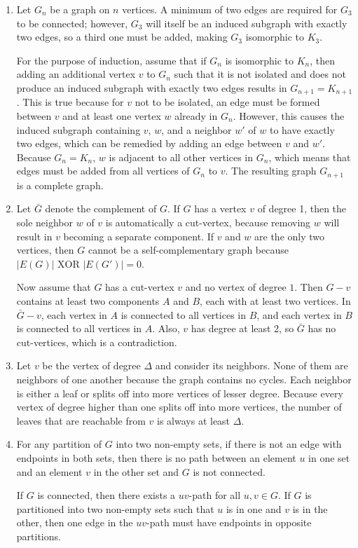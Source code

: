 \documentclass[a4paper,12pt]{article}
\begin{document}
\begin{enumerate}
	\item Let $G_n$ be a graph on $n$ vertices. A minimum of two edges are required for $G_3$ to be connected; however, $G_3$ will itself be an induced subgraph with exactly two edges, so a third one must be added, making $G_3$ isomorphic to $K_3$. \par
	For the purpose of induction, assume that if $G_n$ is isomorphic to $K_n$, then adding an additional vertex $v$ to $G_n$ such that it is not isolated and does not produce an induced subgraph with exactly two edges results in $G_{n + 1} = K_{n + 1}$. This is true because for $v$ not to be isolated, an edge must be formed between $v$ and at least one vertex $w$ already in $G_n$. However, this causes the induced subgraph containing $v$, $w$, and a neighbor $w'$ of $w$ to have exactly two edges, which can be remedied by adding an edge between $v$ and $w'$. Because $G_n = K_n$, $w$ is adjacent to all other vertices in $G_n$, which means that edges must be added from all vertices of $G_n$ to $v$. The resulting graph $G_{n + 1}$ is a complete graph.
	
	\item Let $\bar{G}$ denote the complement of $G$. If $G$ has a vertex $v$ of degree 1, then the sole neighbor $w$ of $v$ is automatically a cut-vertex, because removing $w$ will result in ${v}$ becoming a separate component. If $v$ and $w$ are the only two vertices, then $G$ cannot be a self-complementary graph because $|E(G)|\mbox{ XOR }|E(G')| = 0$. \par
	Now assume that $G$ has a cut-vertex $v$ and no vertex of degree $1$. Then $G - v$ contains at least two components $A$ and $B$, each with at least two vertices. In $\bar{G} - v$, each vertex in $A$ is connected to all vertices in $B$, and each vertex in $B$ is connected to all vertices in $A$. Also, $v$ has degree at least 2, so $\bar{G}$ has no cut-vertices, which is a contradiction.
	
	\item Let $v$ be the vertex of degree $\Delta$ and consider its neighbors. None of them are neighbors of one another because the graph contains no cycles. Each neighbor is either a leaf or splits off into more vertices of lesser degree. Because every vertex of degree higher than one splits off into more vertices, the number of leaves that are reachable from $v$ is always at least $\Delta$.
	
	\item For any partition of $G$ into two non-empty sets, if there is not an edge with endpoints in both sets, then there is no path between an element $u$ in one set and an element $v$ in the other set and $G$ is not connected. \par
	If $G$ is connected, then there exists a $uv$-path for all $u, v \in G$. If $G$ is partitioned into two non-empty sets such that $u$ is in one and $v$ is in the other, then one edge in the $uv$-path must have endpoints in opposite partitions.
	
\end{enumerate}
\end{document}
